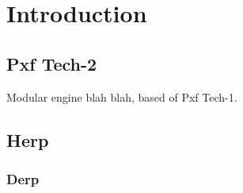 
\chapter{Introduction}

\section{Pxf Tech-2}
Modular engine blah blah, based of Pxf Tech-1.

\newpage
\section{Herp}
\subsection{Derp}
